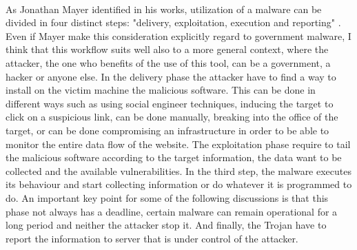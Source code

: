 \paragraph{}
As Jonathan Mayer identified in his works, utilization of a malware can be divided in four distinct steps: "delivery, exploitation, execution and reporting" \cite{malware_steps}. Even if Mayer make this consideration explicitly regard to government malware, I think that this workflow suits well also to a more general context, where the attacker, the one who benefits of the use of this tool, can be a government, a hacker or anyone else. In the delivery phase the attacker have to find a way to install on the victim machine the malicious software. This can be done in different ways such as using social engineer techniques, inducing the target to click on a suspicious link, can be done manually, breaking into the office of the target, or can be done compromising an infrastructure in order to be able to monitor the entire data flow of the website. The exploitation phase require to tail the malicious software according to the target information, the data want to be collected and the available vulnerabilities. In the third step, the malware executes its behaviour and start collecting information or do whatever it is programmed to do. An important key point for some of the following discussions is that this phase not always has a deadline, certain malware can remain operational for a long period and neither the attacker stop it. And finally, the Trojan have to report the information to server that is under control of the attacker. 


